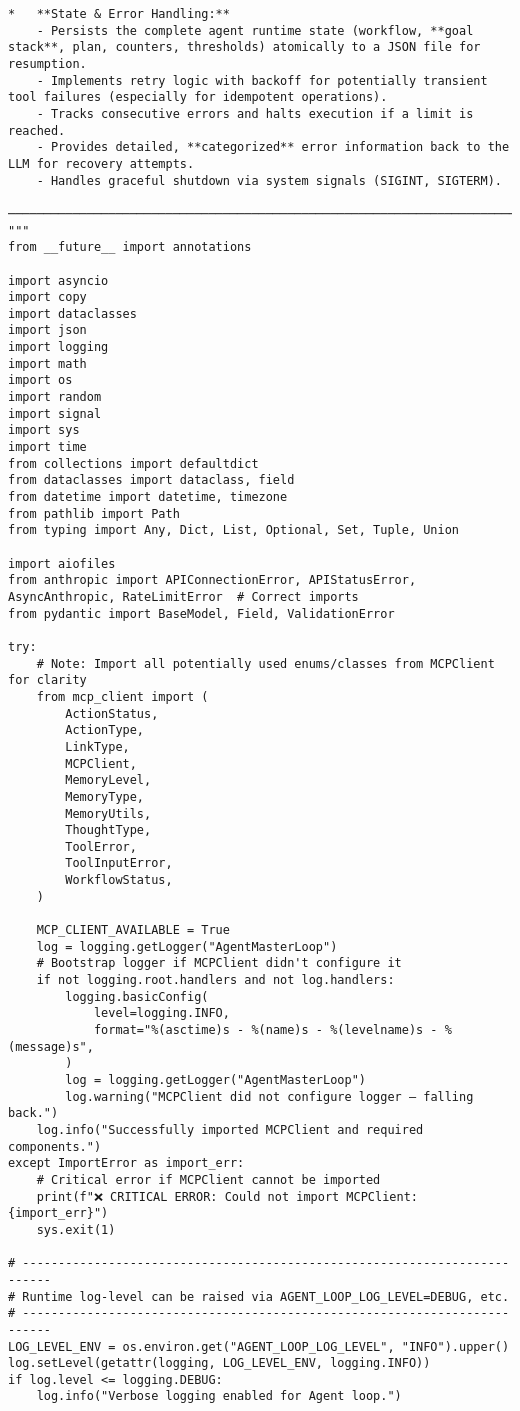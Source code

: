 \documentclass[12pt,a4paper]{article}
\begin{document}
\begin{pageablecode}
\begin{verbatim}
*   **State & Error Handling:**
    - Persists the complete agent runtime state (workflow, **goal stack**, plan, counters, thresholds) atomically to a JSON file for resumption.
    - Implements retry logic with backoff for potentially transient tool failures (especially for idempotent operations).
    - Tracks consecutive errors and halts execution if a limit is reached.
    - Provides detailed, **categorized** error information back to the LLM for recovery attempts.
    - Handles graceful shutdown via system signals (SIGINT, SIGTERM).

────────────────────────────────────────────────────────────────────────────
"""
from __future__ import annotations

import asyncio
import copy
import dataclasses
import json
import logging
import math
import os
import random
import signal
import sys
import time
from collections import defaultdict
from dataclasses import dataclass, field
from datetime import datetime, timezone
from pathlib import Path
from typing import Any, Dict, List, Optional, Set, Tuple, Union

import aiofiles
from anthropic import APIConnectionError, APIStatusError, AsyncAnthropic, RateLimitError  # Correct imports
from pydantic import BaseModel, Field, ValidationError

try:
    # Note: Import all potentially used enums/classes from MCPClient for clarity
    from mcp_client import (
        ActionStatus,
        ActionType,
        LinkType,
        MCPClient,
        MemoryLevel,
        MemoryType,
        MemoryUtils,
        ThoughtType,
        ToolError,
        ToolInputError,
        WorkflowStatus,
    )

    MCP_CLIENT_AVAILABLE = True
    log = logging.getLogger("AgentMasterLoop")
    # Bootstrap logger if MCPClient didn't configure it
    if not logging.root.handlers and not log.handlers:
        logging.basicConfig(
            level=logging.INFO,
            format="%(asctime)s - %(name)s - %(levelname)s - %(message)s",
        )
        log = logging.getLogger("AgentMasterLoop")
        log.warning("MCPClient did not configure logger – falling back.")
    log.info("Successfully imported MCPClient and required components.")
except ImportError as import_err:
    # Critical error if MCPClient cannot be imported
    print(f"❌ CRITICAL ERROR: Could not import MCPClient: {import_err}")
    sys.exit(1)

# --------------------------------------------------------------------------
# Runtime log‑level can be raised via AGENT_LOOP_LOG_LEVEL=DEBUG, etc.
# --------------------------------------------------------------------------
LOG_LEVEL_ENV = os.environ.get("AGENT_LOOP_LOG_LEVEL", "INFO").upper()
log.setLevel(getattr(logging, LOG_LEVEL_ENV, logging.INFO))
if log.level <= logging.DEBUG:
    log.info("Verbose logging enabled for Agent loop.")


\end{verbatim}
\end{pageablecode}
\end{document}
